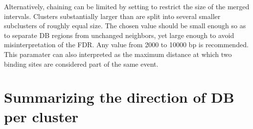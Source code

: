 \documentclass{report}\usepackage[]{graphicx}\usepackage[usenames,dvipsnames]{color}
\newcommand{\hlnum}[1]{\textcolor[rgb]{0.816,0.125,0.439}{#1}}%
\newcommand{\hlopt}[1]{\textcolor[rgb]{0,0,0}{#1}}%
\newcommand{\hlstd}[1]{\textcolor[rgb]{0.251,0.251,0.251}{#1}}%
\newcommand{\hlkwb}[1]{\textcolor[rgb]{0,0,0}{#1}}%
\newcommand{\hlkwc}[1]{\textcolor[rgb]{0.251,0.251,0.251}{#1}}%
\newcommand{\hlkwd}[1]{\textcolor[rgb]{0.878,0.439,0.125}{#1}}%
\newenvironment{knitrout}{}{} %
\begin{document}
\begin{knitrout}
\color{fgcolor}
\end{knitrout}

Alternatively, chaining can be limited by setting  to restrict the size of the merged intervals. 
Clusters substantially larger than  are split into several smaller subclusters of roughly equal size.
The chosen value should be small enough so as to separate DB regions from unchanged neighbors, yet large enough to avoid misinterpretation of the FDR.
Any value from 2000 to 10000 bp is recommended. 
This paramater can also interpreted as the maximum distance at which two binding sites are considered part of the same event.

\begin{knitrout}
\color{fgcolor}
\end{knitrout}

\section{Summarizing the direction of DB per cluster}
\end{document}
